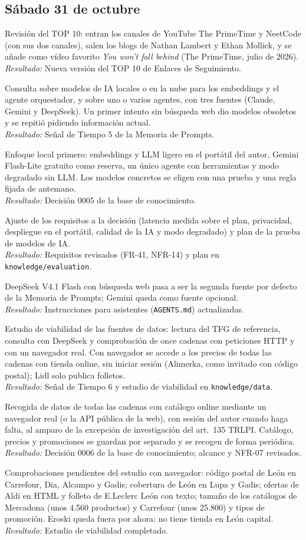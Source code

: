 \documentclass[11pt,a4paper]{article}
\newcommand{\actividad}[3]{\item[\textbf{[#1]}] #2 \\ \textit{Resultado:} #3}
\begin{document}
	\subsection*{Sábado 31 de octubre}
	\begin{description}[leftmargin=0pt, itemsep=6pt]
		\actividad{Tarea}{Revisión del TOP 10: entran los canales de YouTube The PrimeTime y NeetCode (con sus dos canales), salen los blogs de Nathan Lambert y Ethan Mollick, y se añade como vídeo favorito \textit{You won't fall behind} (The PrimeTime, julio de 2026).}{Nueva versión del TOP 10 de Enlaces de Seguimiento.}
		\actividad{Investigación}{Consulta sobre modelos de IA locales o en la nube para los embeddings y el agente orquestador, y sobre uno o varios agentes, con tres fuentes (Claude, Gemini y DeepSeek). Un primer intento sin búsqueda web dio modelos obsoletos y se repitió pidiendo información actual.}{Señal de Tiempo 5 de la Memoria de Prompts.}
		\actividad{Decisión}{Enfoque local primero: embeddings y LLM ligero en el portátil del autor, Gemini Flash-Lite gratuito como reserva, un único agente con herramientas y modo degradado sin LLM. Los modelos concretos se eligen con una prueba y una regla fijada de antemano.}{Decisión 0005 de la base de conocimiento.}
		\actividad{Análisis}{Ajuste de los requisitos a la decisión (latencia medida sobre el plan, privacidad, despliegue en el portátil, calidad de la IA y modo degradado) y plan de la prueba de modelos de IA.}{Requisitos revisados (FR-41, NFR-14) y plan en \texttt{knowledge/evaluation}.}
		\actividad{Tarea}{DeepSeek V4.1 Flash con búsqueda web pasa a ser la segunda fuente por defecto de la Memoria de Prompts; Gemini queda como fuente opcional.}{Instrucciones para asistentes (\texttt{AGENTS.md}) actualizadas.}
		\actividad{Investigación}{Estudio de viabilidad de las fuentes de datos: lectura del TFG de referencia, consulta con DeepSeek y comprobación de once cadenas con peticiones HTTP y con un navegador real. Con navegador se accede a los precios de todas las cadenas con tienda online, sin iniciar sesión (Alimerka, como invitado con código postal); Lidl solo publica folletos.}{Señal de Tiempo 6 y estudio de viabilidad en \texttt{knowledge/data}.}
		\actividad{Decisión}{Recogida de datos de todas las cadenas con catálogo online mediante un navegador real (o la API pública de la web), con sesión del autor cuando haga falta, al amparo de la excepción de investigación del art.~135 TRLPI. Catálogo, precios y promociones se guardan por separado y se recogen de forma periódica.}{Decisión 0006 de la base de conocimiento; alcance y NFR-07 revisados.}
		\actividad{Investigación}{Comprobaciones pendientes del estudio con navegador: código postal de León en Carrefour, Dia, Alcampo y Gadis; cobertura de León en Lupa y Gadis; ofertas de Aldi en HTML y folleto de E.Leclerc León con texto; tamaño de los catálogos de Mercadona (unos 4.560 productos) y Carrefour (unos 25.800) y tipos de promoción. Eroski queda fuera por ahora: no tiene tienda en León capital.}{Estudio de viabilidad completado.}
	\end{description}
\end{document}
